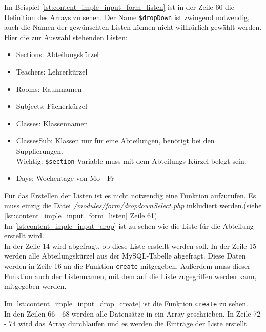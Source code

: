 

Im Beispiel-\autoref{lst:content_imple_input_form_listen} ist in der Zeile 60 die Definition des Arrays zu sehen. Der Name \texttt{\$dropDown} ist zwingend notwendig, auch die Namen der gewünschten Listen können nicht willkürlich gewählt werden. Hier die zur Auswahl stehenden Listen:
\begin{itemize}
	\item Sections: Abteilungskürzel
	\item Teachers: Lehrerkürzel
	\item Rooms: Raumnamen
	\item Subjects: Fächerkürzel
	\item Classes: Klassennamen
	\item ClassesSub: Klassen nur für eine Abteilungen, benötigt bei den Supplierungen. \\
	Wichtig: \texttt{\$section}-Variable muss mit dem Abteilungs-Kürzel belegt sein.
	\item Days: Wochentage von Mo - Fr
\end{itemize}
Für das Erstellen der Listen ist es nicht notwendig eine Funktion aufzurufen. Es muss einzig die Datei \textit{/modules/form/dropdownSelect.php} inkludiert werden.(siehe \autoref{lst:content_imple_input_form_listen} Zeile 61)\\
Im \autoref{lst:content_imple_input_drop} ist zu sehen wie die Liste für die Abteilung erstellt wird.\\
In der Zeile 14 wird abgefragt, ob diese Liste erstellt werden soll. In der Zeile 15 werden alle Abteilungskürzel aus der MySQL-Tabelle abgefragt. Diese Daten werden in Zeile 16 an die Funktion \texttt{create} mitgegeben. Außerdem muss dieser Funktion auch der Listennamen, mit dem auf die Liste zugegriffen werden kann, mitgegeben werden.

Im \autoref{lst:content_imple_input_drop_create} ist die Funktion \texttt{create} zu sehen.\\
In den Zeilen 66 - 68 werden alle Datensätze in ein Array geschrieben. In Zeile 72 - 74 wird das Array durchlaufen und es werden die Einträge der Liste erstellt.
